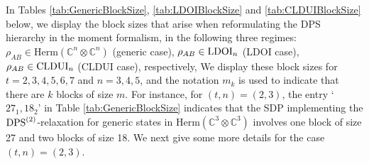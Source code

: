 \documentclass[11pt]{article}
\newcommand{\C}{\ensuremath{\mathbb{C}}} %
\newcommand{\Herm}{\mathrm{Herm}}
\newcommand{\CLDUI}{\text{\rm CLDUI}}
\newcommand{\LDOI}{\text{\rm LDOI}}
\newcommand{\DPS}{\text{\rm DPS}}
\newcommand{\ot}{\otimes}
\theoremstyle{plain}
\begin{document}

In Tables \ref{tab:GenericBlockSize}, \ref{tab:LDOIBlockSize} and \ref{tab:CLDUIBlockSize} below, we display the block sizes that arise when reformulating the DPS hierarchy in the moment formalism,   in the following three  regimes:  $\rho_{AB}\in \Herm(\C^n\ot \C^n)$ (generic case),  $\rho_{AB}\in \LDOI_n$ (LDOI case),  $\rho_{AB}\in \CLDUI_n$ (CLDUI case), respectively, We display these block sizes  for  $t=2,3,4,5,6,7$ and $n=3,4,5$, and the notation   $m_k$ is used to indicate that there are $k$ blocks of size $m$. For instance,  for $(t,n)=(2,3)$,   the entry  `$27_1, 18_2$' in Table \ref{tab:GenericBlockSize}  indicates that the SDP implementing the $\DPS^{(2)}$-relaxation for generic states in $\Herm(\C^3\ot \C^3)$ involves one block of size 27 and two blocks of size 18.
We next give some more details for the case $(t,n)=(2,3)$.
\end{document}
